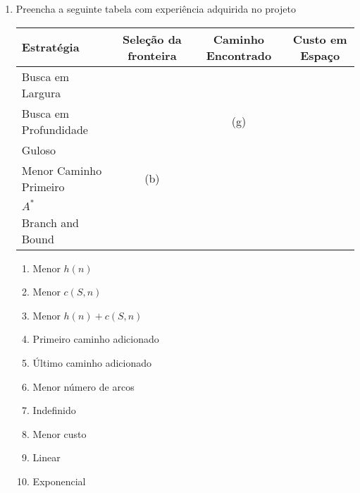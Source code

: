 \documentclass{article}
\begin{document}
\begin{enumerate}

    
    
    


\item  Preencha a seguinte tabela com experiência adquirida no projeto

    \begin{center}
        \begin{tabular}{|l|c|c|c|}
        \hline
        Estratégia            & Seleção da fronteira & Caminho Encontrado & Custo em Espaço \\
        \hline
        Busca em Largura      &     &   &   \\
        \hline
        Busca em Profundidade &     & (g)  &   \\
        \hline
        Guloso                &     &   &   \\
        \hline
        Menor Caminho Primeiro& (b) &   &   \\
        \hline
        $A^*$                 &     &   &   \\
        \hline
        Branch and Bound      &     &   &   \\
        \hline
    \end{tabular}
    \end{center}
    
    \begin{enumerate}
        \item Menor $h(n)$
        \item Menor $c(S,n)$
        \item Menor $h(n) + c(S,n)$
        \item Primeiro caminho adicionado 
        \item Último caminho adicionado 
        \item Menor número de arcos
        \item Indefinido
        \item Menor custo
        \item Linear 
        \item Exponencial
   

\end{enumerate}
\end{enumerate}
\end{document}
